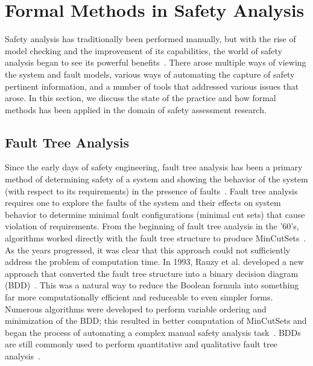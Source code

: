 \section{Formal Methods in Safety Analysis}
\label{sec:modelCheckingInSA}
Safety analysis has traditionally been performed manually, but with the rise of model checking and the improvement of its capabilities, the world of safety analysis began to see its powerful benefits~\cite{hinchey2012industrial, liggesmeyer1998improving, coudert1993fault, Bozzano:2010:DSA:1951720,bozzano2003esacs}. There arose multiple ways of viewing the system and fault models, various ways of automating the capture of safety pertinent information, and a number of tools that addressed various issues that arose. In this section, we discuss the state of the practice and how formal methods has been applied in the domain of safety assessment research.

\subsection{Fault Tree Analysis}
Since the early days of safety engineering, fault tree analysis has been a primary method of determining safety of a system and showing the behavior of the system (with respect to its requirements) in the presence of faults~\cite{0f356f05e72f43018211b36f97c8854a,vesely1981fault}. Fault tree analysis requires one to explore the faults of the system and their effects on system behavior to determine minimal fault configurations (minimal cut sets) that cause violation of requirements. From the beginning of fault tree analysis in the '60's, algorithms worked directly with the fault tree structure to produce MinCutSets~\cite{10020219108,semanderes1971elraft}. As the years progressed, it was clear that this approach could not sufficiently address the problem of computation time. In 1993, Rauzy et al. developed a new approach that converted the fault tree structure into a binary decision diagram (BDD)~\cite{rauzy1993new}. This was a natural way to reduce the Boolean formula into something far more computationally efficient and reduceable to even simpler forms. Numerous algorithms were developed to perform variable ordering and minimization of the BDD; this resulted in better computation of MinCutSets and began the process of automating a complex manual safety analysis task~\cite{sinnamon1997new,bryant1986graph,aralia1996computation,reay2002fault,rauzy2007assessment}. BDDs are still commonly used to perform quantitative and qualitative fault tree analysis~\cite{ge2015quantitative,jiang2018algebraic,banov2019new}.

